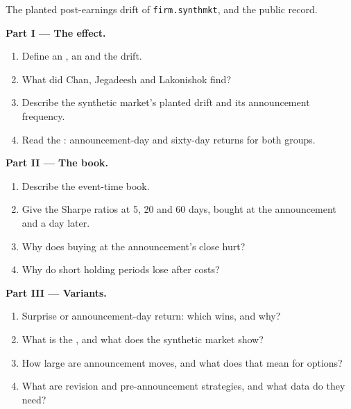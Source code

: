 \begin{problem}\label{pb:s1:earnings:1}
The planted post-earnings drift of \texttt{firm.synthmkt}, and the public record.

\medskip\noindent\textbf{Part I --- The effect.}
\begin{enumerate}
\item Define an , an  and the drift.
\item What did Chan, Jegadeesh and Lakonishok find?
\item Describe the synthetic market's planted drift and its announcement frequency.
\item Read the : announcement-day and sixty-day returns for both groups.
\end{enumerate}

\medskip\noindent\textbf{Part II --- The book.}
\begin{enumerate}[resume]
\item Describe the event-time book.
\item Give the Sharpe ratios at 5, 20 and 60 days, bought at the announcement and a day later.
\item Why does buying at the announcement's close hurt?
\item Why do short holding periods lose after costs?
\end{enumerate}

\medskip\noindent\textbf{Part III --- Variants.}
\begin{enumerate}[resume]
\item Surprise or announcement-day return: which wins, and why?
\item What is the , and what does the synthetic market show?
\item How large are announcement moves, and what does that mean for options?
\item What are revision and pre-announcement strategies, and what data do they need?
\end{enumerate}


\end{problem}
